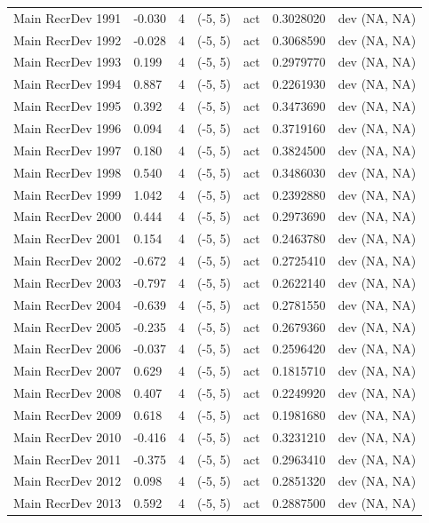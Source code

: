 \documentclass[11pt,
  english,
  a4paper,
]{article}
\begin{document}
\begin{landscape}
\begin{longtable}[t]{>{\raggedright\arraybackslash}p{8.5cm}lllll>{\raggedright\arraybackslash}p{4cm}}
Main RecrDev 1991 & -0.030 & 4 & (-5, 5) & act & 0.3028020 & dev (NA, NA)\\
Main RecrDev 1992 & -0.028 & 4 & (-5, 5) & act & 0.3068590 & dev (NA, NA)\\
Main RecrDev 1993 & 0.199 & 4 & (-5, 5) & act & 0.2979770 & dev (NA, NA)\\
Main RecrDev 1994 & 0.887 & 4 & (-5, 5) & act & 0.2261930 & dev (NA, NA)\\
Main RecrDev 1995 & 0.392 & 4 & (-5, 5) & act & 0.3473690 & dev (NA, NA)\\
Main RecrDev 1996 & 0.094 & 4 & (-5, 5) & act & 0.3719160 & dev (NA, NA)\\
Main RecrDev 1997 & 0.180 & 4 & (-5, 5) & act & 0.3824500 & dev (NA, NA)\\
Main RecrDev 1998 & 0.540 & 4 & (-5, 5) & act & 0.3486030 & dev (NA, NA)\\
Main RecrDev 1999 & 1.042 & 4 & (-5, 5) & act & 0.2392880 & dev (NA, NA)\\
Main RecrDev 2000 & 0.444 & 4 & (-5, 5) & act & 0.2973690 & dev (NA, NA)\\
Main RecrDev 2001 & 0.154 & 4 & (-5, 5) & act & 0.2463780 & dev (NA, NA)\\
Main RecrDev 2002 & -0.672 & 4 & (-5, 5) & act & 0.2725410 & dev (NA, NA)\\
Main RecrDev 2003 & -0.797 & 4 & (-5, 5) & act & 0.2622140 & dev (NA, NA)\\
Main RecrDev 2004 & -0.639 & 4 & (-5, 5) & act & 0.2781550 & dev (NA, NA)\\
Main RecrDev 2005 & -0.235 & 4 & (-5, 5) & act & 0.2679360 & dev (NA, NA)\\
Main RecrDev 2006 & -0.037 & 4 & (-5, 5) & act & 0.2596420 & dev (NA, NA)\\
Main RecrDev 2007 & 0.629 & 4 & (-5, 5) & act & 0.1815710 & dev (NA, NA)\\
Main RecrDev 2008 & 0.407 & 4 & (-5, 5) & act & 0.2249920 & dev (NA, NA)\\
Main RecrDev 2009 & 0.618 & 4 & (-5, 5) & act & 0.1981680 & dev (NA, NA)\\
Main RecrDev 2010 & -0.416 & 4 & (-5, 5) & act & 0.3231210 & dev (NA, NA)\\
Main RecrDev 2011 & -0.375 & 4 & (-5, 5) & act & 0.2963410 & dev (NA, NA)\\
Main RecrDev 2012 & 0.098 & 4 & (-5, 5) & act & 0.2851320 & dev (NA, NA)\\
Main RecrDev 2013 & 0.592 & 4 & (-5, 5) & act & 0.2887500 & dev (NA, NA)\\

\end{longtable}
\end{landscape}
\end{document}
